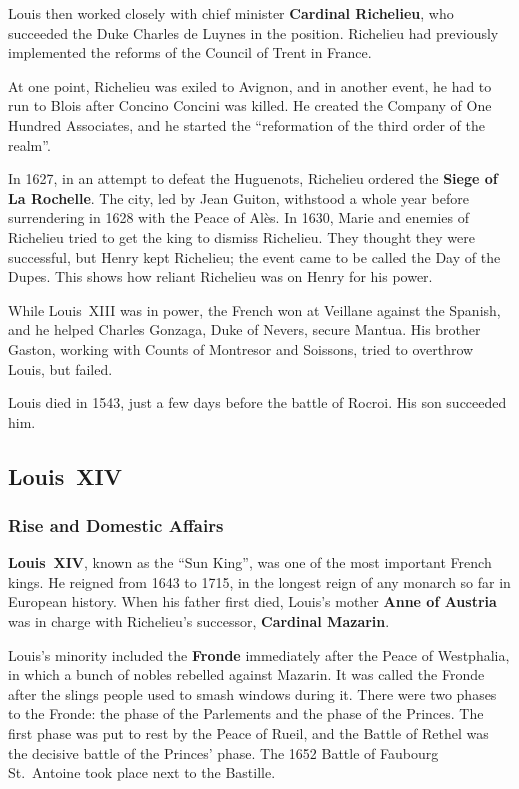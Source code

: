 Louis then worked closely with chief minister \textbf{Cardinal Richelieu},
who succeeded the Duke Charles de Luynes in the position.
Richelieu had previously implemented the reforms of the Council of Trent in France.

At one point, Richelieu was exiled to Avignon,
and in another event, he had to run to Blois after Concino Concini was killed.
He created the Company of One Hundred Associates,
and he started the ``reformation of the third order of the realm''.

In 1627, in an attempt to defeat the Huguenots, Richelieu ordered the \textbf{Siege of La Rochelle}.
The city, led by Jean Guiton, withstood a whole year before surrendering in 1628 with the Peace of Al\`es.
In 1630, Marie and enemies of Richelieu tried to get the king to dismiss Richelieu.
They thought they were successful, but Henry kept Richelieu;
the event came to be called the Day of the Dupes.
This shows how reliant Richelieu was on Henry for his power.

While Louis~XIII was in power, the French won at Veillane against the Spanish,
and he helped Charles Gonzaga, Duke of Nevers, secure Mantua.
His brother Gaston, working with Counts of Montresor and Soissons,
tried to overthrow Louis, but failed.

Louis died in 1543, just a few days before the battle of Rocroi.
His son succeeded him.

\subsection*{Louis~XIV}

\subsubsection*{Rise and Domestic Affairs}

\textbf{Louis~XIV}, known as the ``Sun King'', was one of the most important French kings.
He reigned from 1643 to 1715, in the longest reign of any monarch so far in European history.
When his father first died,
Louis's mother \textbf{Anne of Austria} was in charge with Richelieu's successor, \textbf{Cardinal Mazarin}.

Louis's minority included the \textbf{Fronde} immediately after the Peace of Westphalia,
in which a bunch of nobles rebelled against Mazarin.
It was called the Fronde after the slings people used to smash windows during it.
There were two phases to the Fronde: the phase of the Parlements and the phase of the Princes.
The first phase was put to rest by the Peace of Rueil,
and the Battle of Rethel was the decisive battle of the Princes' phase.
The 1652 Battle of Faubourg St.\ Antoine took place next to the Bastille.

